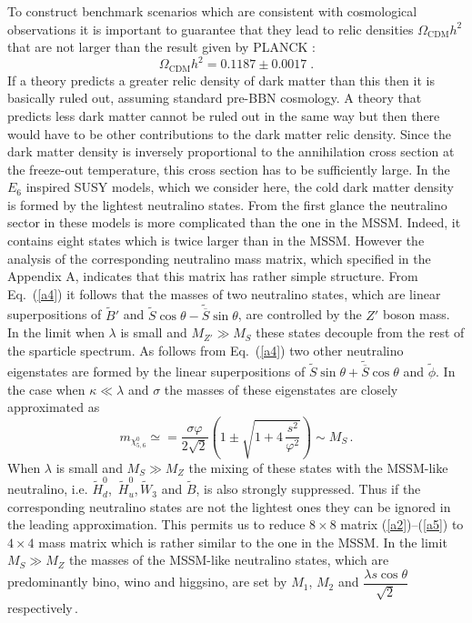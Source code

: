 \documentclass[12pt,a4paper]{article}
\newcommand{\be}{\begin{equation}}
\newcommand{\ee}{\end{equation}}
\begin{document}
To construct benchmark scenarios which are consistent with cosmological observations it is important to guarantee that
they lead to relic densities $\Omega_{\mathrm{CDM}} h^2$ that are not larger than the result given by PLANCK \cite{Ade:2013zuv}:
\be
\Omega_{\mathrm{CDM}} h^2 = 0.1187 \pm 0.0017 \;.
\label{hd32}
\ee
If a theory predicts a greater relic density of dark matter than this then it is basically ruled out, assuming standard pre-BBN
cosmology. A theory that predicts less dark matter cannot be ruled out in the same way but then there would have to be
other contributions to the dark matter relic density. Since the dark matter density is inversely proportional to the annihilation
cross section at the freeze-out temperature, this cross section has to be sufficiently large. In the $E_6$ inspired SUSY models,
which we consider here, the cold dark matter density is formed by the lightest neutralino states. From the first glance
the neutralino sector in these models is more complicated than the one in the MSSM. Indeed, it contains eight states which is
twice larger than in the MSSM. However the analysis of the corresponding neutralino mass matrix, which specified in the Appendix A,
indicates that this matrix has rather simple structure. From Eq.~(\ref{a4}) it follows that the masses of two neutralino states,
which are linear superpositions of $\tilde{B}'$ and $\tilde{S}\cos\theta-\tilde{\overline{S}}\sin\theta$, are controlled by
the $Z'$ boson mass. In the limit when $\lambda$ is small and $M_{Z'}\gg M_S$ these states decouple from the rest of the
sparticle spectrum. As follows from Eq.~(\ref{a4}) two other neutralino eigenstates are formed by the linear superpositions of
$\tilde{S}\sin\theta+\tilde{\overline{S}}\cos\theta$ and $\tilde{\phi}$. In the case when $\kappa\ll \lambda$ and $\sigma$
the masses of these eigenstates are closely approximated as
\be
m_{\chi^0_{5,6}}\simeq = \dfrac{\sigma\varphi}{2\sqrt{2}}\left(1 \pm \sqrt{1+4\,\dfrac{s^2}{\varphi^2}}\right)\sim M_S\,.
\label{hd33}
\ee
When $\lambda$ is small and $M_S\gg M_Z$  the mixing of these states with the MSSM-like neutralino, i.e. $\tilde{H}^0_d$,\,
$\tilde{H}^0_u$,\,$\tilde{W}_3$ and $\tilde{B}$, is also strongly suppressed. Thus if the corresponding neutralino states are
not the lightest ones they can be ignored in the leading approximation. This permits us to reduce $8\times 8$ matrix
(\ref{a2})--(\ref{a5}) to $4\times 4$ mass matrix which is rather similar to the one in the MSSM. In the limit  $M_S\gg M_Z$
the masses of the MSSM-like neutralino states, which are predominantly bino, wino and higgsino, are set by $M_1$, $M_2$
and $\dfrac{\lambda s \cos\theta}{\sqrt{2}}$ respectively\,.
\end{document}
